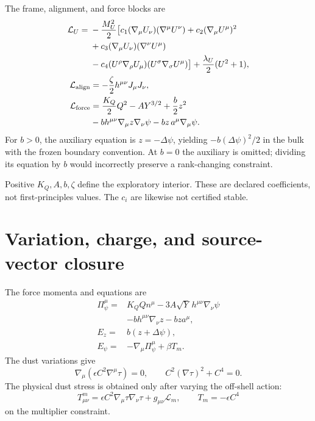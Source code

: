 \documentclass[aps,prd,reprint,superscriptaddress,nofootinbib,floatfix]{revtex4-2}
\begin{document}
The frame, alignment, and force blocks are
\begin{align}
 \mathcal L_U={}&-\frac{M_U^2}{2}\big[
 c_1(\nabla_\mu U_\nu)(\nabla^\mu U^\nu)
 +c_2(\nabla_\mu U^\mu)^2 \nonumber\\
 &+c_3(\nabla_\mu U_\nu)(\nabla^\nu U^\mu)\nonumber\\
 &-c_4(U^\rho\nabla_\rho U_\mu)
       (U^\sigma\nabla_\sigma U^\mu)\big]
 +\frac{\lambda_U}{2}(U^2+1),\\
 \mathcal L_{\rm align}&=-\frac{\zeta}{2}h^{\mu\nu}J_\mu J_\nu,\\
 \mathcal L_{\rm force}&=\frac{K_Q}{2}Q^2-A Y^{3/2}
 +\frac b2z^2\nonumber\\
 &-bh^{\mu\nu}\nabla_\mu z\nabla_\nu\psi
 -bz\,a^\mu\nabla_\mu\psi .
 \label{eq:force}
\end{align}
For \(b>0\), the auxiliary equation is \(z=-\Delta\psi\), yielding
\(-b(\Delta\psi)^2/2\) in the bulk with the frozen boundary convention.  At
\(b=0\) the auxiliary is omitted; dividing its equation by \(b\) would
incorrectly preserve a rank-changing constraint.

Positive \(K_Q,A,b,\zeta\) define the exploratory interior.  These are declared
coefficients, not first-principles values.  The \(c_i\) are likewise not
certified stable.

\section{Variation, charge, and source-vector closure}
\label{sec:variation}

The force momenta and equations are
\begin{align}
 \Pi_\psi^\mu={}&K_QQn^\mu
 -3A\sqrt{Y}\,h^{\mu\nu}\nabla_\nu\psi\nonumber\\
 &-bh^{\mu\nu}\nabla_\nu z-bza^\mu,\\
 E_z={}&b(z+\Delta\psi),\\
 E_\psi={}&-\nabla_\mu\Pi_\psi^\mu+\beta T_m .
 \label{eq:force-eom}
\end{align}
The dust variations give
\begin{equation}
 \nabla_\mu(\epsilon C^2\nabla^\mu\tau)=0,
 \qquad C^2(\nabla\tau)^2+C^4=0.
 \label{eq:dust-eom}
\end{equation}
The physical dust stress is obtained only after varying the off-shell action:
\begin{equation}
 T^m_{\mu\nu}
 =\epsilon C^2\nabla_\mu\tau\nabla_\nu\tau+g_{\mu\nu}\mathcal L_m,
 \qquad T_m=-\epsilon C^4
 \label{eq:dust-stress}
\end{equation}
on the multiplier constraint.
\end{document}
